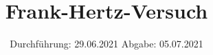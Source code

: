 

\subject{V601}
\title{Frank-Hertz-Versuch}
\date{%
  Durchführung: 29.06.2021
  \hspace{3em}
  Abgabe: 05.07.2021
}



\maketitle
\thispagestyle{empty}
\tableofcontents
\newpage






\printbibliography{}


